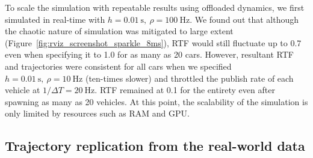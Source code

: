 \documentclass[aps,pra,twocolumn,notitlepage,nofootinbib,superscriptaddress]{revtex4-1}
\begin{document}
To scale the simulation with repeatable results using offloaded dynamics, we first simulated in real-time with $h = 0.01~\textrm{s},~\rho = 100~\textrm{Hz}$. We found out that although the chaotic nature of simulation was mitigated to large extent (Figure~\ref{fig:rviz_screenshot_sparkle_8ms}), RTF would still fluctuate up to 0.7 even when specifying it to 1.0 for as many as 20 cars. However, resultant RTF and trajectories were consistent for all cars when we specified $h = 0.01~\textrm{s},~\rho = 10~\textrm{Hz}$ (ten-times slower) and throttled the publish rate of each vehicle at $1/\Delta T = 20~\textrm{Hz}$. 
RTF remained at 0.1 for the entirety even after spawning as many as 20 vehicles.
At this point, the scalability of the simulation is only limited by resources such as RAM and GPU. 


\subsection{Trajectory replication from the real-world data}
\label{sec:traj_replicate}
\end{document}
